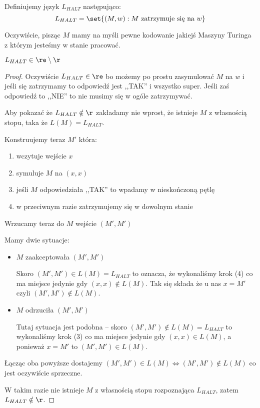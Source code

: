 \begin{definition}
    Definiujemy język \( L_{HALT} \) następująco:
    \[
        L_{HALT} = \set{(M, w) : M \text{ zatrzymuje się na } w}
    \]
\end{definition}

Oczywiście, pisząc \(M\) mamy na myśli pewne kodowanie jakiejś Maszyny Turinga z którym jesteśmy w stanie pracować. 

\begin{theorem}
    \( L_{HALT} \in \re \setminus \r \)
\end{theorem}
\begin{proof}
    Oczywiście \( L_{HALT} \in \re \) bo możemy po prostu zasymulować \( M \) na \( w \) i jeśli się zatrzymamy to odpowiedź jest ,,TAK'' i wszystko super. Jeśli zaś odpowiedź to ,,NIE'' to nie musimy się w ogóle zatrzymywać.
    
    Aby pokazać że \( L_{HALT} \notin \r \) zakładamy nie wprost, że istnieje \( M \) z własnością stopu, taka że \( L(M) = L_{HALT} \).
    
    Konstruujemy teraz \( M' \) która:
    \begin{enumerate}
        \item wczytuje wejście \( x \)
        \item symuluje \( M \) na \( (x, x) \)
        \item jeśli \( M \) odpowiedziała ,,TAK'' to wpadamy w nieskończoną pętlę
        \item w przeciwnym razie zatrzymujemy się w dowolnym stanie
    \end{enumerate}
    
    Wrzucamy teraz do \( M \) wejście \( (M', M') \)
    
    Mamy dwie sytuacje:
    \begin{itemize}
        \item \( M \) zaakceptowała \( (M', M') \)
        
        Skoro \( (M', M') \in L(M) = L_{HALT} \) to oznacza, że
        wykonaliśmy krok (4) co ma miejsce jedynie gdy \( (x, x) \notin L(M) \). Tak się składa że u nas \( x = M' \) czyli \( (M', M') \notin L(M) \).
        
        \item \( M \) odrzuciła \( (M', M') \)
        
        Tutaj sytuacja jest podobna -- skoro \( (M', M') \notin L(M) = L_{HALT} \) to
        wykonaliśmy krok (3) co ma miejsce jedynie gdy \( (x, x) \in L(M) \), a ponieważ \( x = M' \) to \( (M', M') \in L(M) \).
    \end{itemize}
    
    Łącząc oba powyższe dostajemy \( (M', M') \in L(M) \iff (M', M') \notin L(M) \) co jest oczywiście sprzeczne. 
    
    W takim razie nie istnieje \( M \) z własnością stopu rozpoznająca \( L_{HALT} \), zatem \( L_{HALT} \notin \r \).
\end{proof}